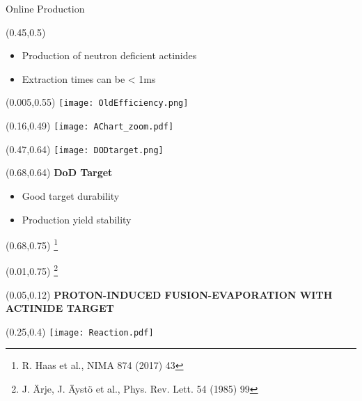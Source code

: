 \documentclass[10pt,aspectratio=169]{beamer}
\begin{document}
\begin{frame}{Online Production}
{		\begin{textblock*}{0.5\paperwidth}(0.45\paperwidth,0.5\paperheight)
			\begin{itemize}
				\item Production of neutron deficient actinides
				\item Extraction times can be < 1ms 
			\end{itemize}
		\end{textblock*}
		\begin{textblock*}{0.15\paperwidth}(0.005\paperwidth,0.55\paperheight)
			\texttt{[image: OldEfficiency.png]}
		\end{textblock*}
		\begin{textblock*}{0.3\paperwidth}(0.16\paperwidth,0.49\paperheight)
			\texttt{[image: AChart\_zoom.pdf]}
		\end{textblock*}
		\begin{textblock*}{0.2\paperwidth}(0.47\paperwidth,0.64\paperheight)
			\texttt{[image: DODtarget.png]}
		\end{textblock*}
		\begin{textblock*}{0.3\paperwidth}(0.68\paperwidth,0.64\paperheight)
			\textbf{DoD Target}
			\begin{itemize}
				\item Good target durability
				\item Production yield stability
			\end{itemize}
		\end{textblock*}
		\begin{textblock*}{0.1\paperwidth}(0.68\paperwidth,0.75\paperheight)
			\footnote{R. Haas et al., NIMA 874 (2017) 43}
		\end{textblock*}
		\begin{textblock*}{0.1\paperwidth}(0.01\paperwidth,0.75\paperheight)
			\footnote{J. Ärje, J. Äystö et al., Phys. Rev. Lett. 54 (1985) 99}
		\end{textblock*}
	}
	
\end{frame}


\begin{SectionTitle}
	\begin{frame}
		\centering
		\begin{textblock*}{0.9\paperwidth}(0.05\paperwidth,0.12\paperheight)
			\centering
			\textbf{\LARGE PROTON-INDUCED FUSION-EVAPORATION WITH ACTINIDE TARGET}	
		\end{textblock*}
		\begin{textblock*}{0.5\paperwidth}(0.25\paperwidth,0.4\paperheight)
			\texttt{[image: Reaction.pdf]}
		\end{textblock*}
	\end{frame}
\end{SectionTitle}
\end{document}
